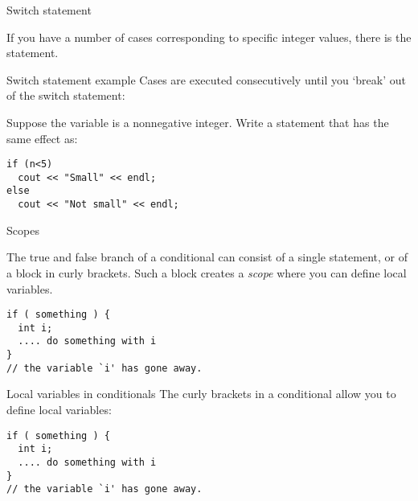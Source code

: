  {Switch statement}

If you have a number of cases corresponding to specific integer
values, there is the  statement.

\begin{block}{Switch statement example}
  \label{sl:switch}
  Cases are executed consecutively until you `break' out of the switch
  statement:
\end{block}

\begin{exercise}
  \label{ex:switch-range}
  Suppose the variable  is a nonnegative integer. Write a
   statement that has the same effect as:
\begin{lstlisting}
if (n<5)
  cout << "Small" << endl;
else
  cout << "Not small" << endl;
\end{lstlisting}

\end{exercise}
 {Scopes}

The true and false branch of a conditional can consist of a single
statement, or of a block in curly brackets. Such a block creates a
%
\emph{scope}
%
where you can define local variables.

\begin{lstlisting}
if ( something ) {
  int i; 
  .... do something with i
}
// the variable `i' has gone away.
\end{lstlisting}

\begin{slide}{Local variables in conditionals}
  \label{sl:if-scope}
  The curly brackets in a conditional allow you to define local variables:
\begin{lstlisting}
if ( something ) {
  int i; 
  .... do something with i
}
// the variable `i' has gone away.
\end{lstlisting}
\end{slide}

